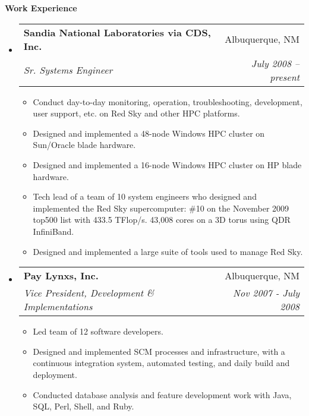 \documentclass[letterpaper,10pt]{article}
\makeatletter
\newcommand{\resitem}[1]{\item #1 \vspace{-2pt}}
\newcommand{\resheading}[1]{{\large{\colorbox{MyGrey}{\textbf{\fontfamily{phv}\selectfont #1 \vphantom{p\^{E}}}}}}}
\newcommand{\ressubheading}[4]{
\begin{tabular*}{6.5in}{l@{\extracolsep{\fill}}r}
		\textbf{#1} & #2 \\
		\textit{#3} & \textit{#4} \\
\end{tabular*}\vspace{-6pt}}
\makeatother
\begin{document}
\resheading{Work Experience}
\begin{itemize}
\item
    \ressubheading{Sandia National Laboratories via CDS, Inc.}{Albuquerque, NM}{Sr. Systems Engineer}{July 2008 -- present}
    \begin{itemize}
        \resitem{Conduct day-to-day monitoring, operation, troubleshooting, development, user support, etc. on Red Sky and other HPC platforms.}
        \resitem{Designed and implemented a 48-node Windows HPC cluster on Sun/Oracle blade hardware.}
        \resitem{Designed and implemented a 16-node Windows HPC cluster on HP blade hardware.}
        \resitem{Tech lead of a team of 10 system engineers who designed and implemented the Red Sky supercomputer: \#10 on the November 2009 top500 list with 433.5 TFlop/s.  43,008 cores on a 3D torus using QDR InfiniBand.}
        \resitem{Designed and implemented a large suite of tools used to manage Red Sky.}
    \end{itemize}
\item
    \ressubheading{Pay Lynxs, Inc.}{Albuquerque, NM}{Vice President, Development \& Implementations}{Nov 2007 - July 2008}
    \begin{itemize}
        \resitem{Led team of 12 software developers.}
        \resitem{Designed and implemented SCM processes and infrastructure, with a continuous integration system, automated testing, and daily build and deployment.}
        \resitem{Conducted database analysis and feature development work with Java, SQL, Perl, Shell, and Ruby.}
    \end{itemize}


\end{itemize}
\end{document}
